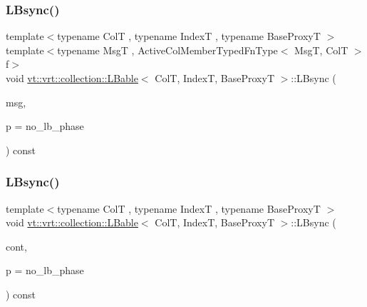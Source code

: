 \mbox{\label{structvt_1_1vrt_1_1collection_1_1_l_bable_a7993e0f7203032a228ea8c98c7f22db6}} 
\subsubsection{\texorpdfstring{L\+Bsync()}{LBsync()}\hspace{0.1cm}{\footnotesize\ttfamily [3/4]}}
{\footnotesize\ttfamily template$<$typename ColT , typename IndexT , typename Base\+ProxyT $>$ \\
template$<$typename MsgT , Active\+Col\+Member\+Typed\+Fn\+Type$<$ Msg\+T, Col\+T $>$ f$>$ \\
void \hyperlink{structvt_1_1vrt_1_1collection_1_1_l_bable}{vt\+::vrt\+::collection\+::\+L\+Bable}$<$ ColT, IndexT, Base\+ProxyT $>$\+::L\+Bsync (\begin{DoxyParamCaption}\item[{\hyperlink{namespacevt_ab2b3d506ec8e8d1540aede826d84a239}{Msg\+Shared\+Ptr}$<$ MsgT $>$}]{msg,  }\item[{\hyperlink{namespacevt_a46ce6733d5cdbd735d561b7b4029f6d7}{Phase\+Type}}]{p = {\ttfamily no\+\_\+lb\+\_\+phase} }\end{DoxyParamCaption}) const}

\mbox{\label{structvt_1_1vrt_1_1collection_1_1_l_bable_afbe9af7e28e18236fd5af36d04e46aca}} 
\subsubsection{\texorpdfstring{L\+Bsync()}{LBsync()}\hspace{0.1cm}{\footnotesize\ttfamily [4/4]}}
{\footnotesize\ttfamily template$<$typename ColT , typename IndexT , typename Base\+ProxyT $>$ \\
void \hyperlink{structvt_1_1vrt_1_1collection_1_1_l_bable}{vt\+::vrt\+::collection\+::\+L\+Bable}$<$ ColT, IndexT, Base\+ProxyT $>$\+::L\+Bsync (\begin{DoxyParamCaption}\item[{\hyperlink{structvt_1_1vrt_1_1collection_1_1_l_bable_a27cc10ccbf93ad3d794998c79f710a5a}{Finished\+L\+B\+Type}}]{cont,  }\item[{\hyperlink{namespacevt_a46ce6733d5cdbd735d561b7b4029f6d7}{Phase\+Type}}]{p = {\ttfamily no\+\_\+lb\+\_\+phase} }\end{DoxyParamCaption}) const}

